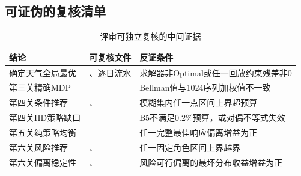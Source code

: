 \subsection{可证伪的复核清单}

\begin{table}[H]
\centering
\caption{评审可独立复核的中间证据}
\begin{tabularx}{0.96\textwidth}{L{2.4cm}Y Y}
\toprule
结论 & 可复核文件 & 反证条件\\
\midrule
确定天气全局最优 & 、逐日流水 & 求解器非Optimal或任一回放约束残差非0\\
第三关精确MDP &  & Bellman值与1024序列加权值不一致\\
第四关条件推荐 & 、 & 模糊集内任一点区间上界超预算\\
第四关IID策略缺口 &  & B5不满足0.2\%预算，或对偶不等式失效\\
第五关纯策略均衡 &  & 任一完整最佳响应偏离增益为正\\
第六关风险推荐 & 、 & 任一固定角色区间上界越界\\
第六关偏离稳定性 & 、 & 风险可行偏离的最坏分布收益增益为正\\
\bottomrule
\end{tabularx}
\end{table}
